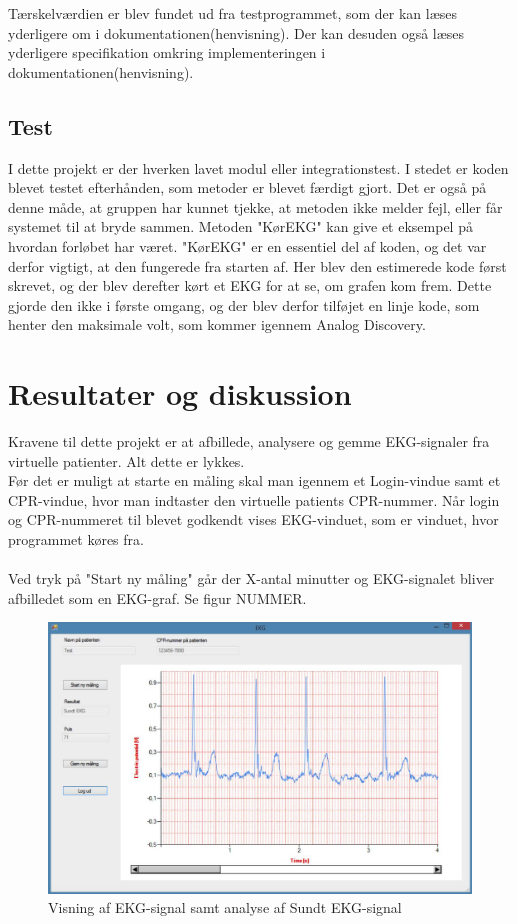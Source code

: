 Tærskelværdien er blev fundet ud fra testprogrammet, som der kan læses yderligere om i dokumentationen(henvisning). Der kan desuden også læses yderligere specifikation omkring implementeringen i dokumentationen(henvisning). 


\subsection{Test}
I dette projekt er der hverken lavet modul eller integrationstest. I stedet er koden blevet testet efterhånden, som metoder er blevet færdigt gjort. Det er også på denne måde, at gruppen har kunnet tjekke, at metoden ikke melder fejl, eller får systemet til at bryde sammen. Metoden "KørEKG" kan give et eksempel på hvordan forløbet har været. "KørEKG" er en essentiel del af koden, og det var derfor vigtigt, at den fungerede fra starten af. Her blev den estimerede kode først skrevet, og der blev derefter kørt et EKG for at se, om grafen kom frem. Dette gjorde den ikke i første omgang, og der blev derfor tilføjet en linje kode, som henter den maksimale volt, som kommer igennem Analog Discovery. 

\section{Resultater og diskussion}
Kravene til dette projekt er at afbillede, analysere og gemme EKG-signaler fra virtuelle patienter. Alt dette er lykkes. \\ 
Før det er muligt at starte en måling skal man igennem et Login-vindue samt et CPR-vindue, hvor man indtaster den virtuelle patients CPR-nummer. Når login og CPR-nummeret til blevet godkendt vises EKG-vinduet, som er vinduet, hvor programmet køres fra. \\ \\
Ved tryk på "Start ny måling" går der X-antal minutter og EKG-signalet bliver afbilledet som en EKG-graf. Se figur NUMMER. 

\begin{figure}[H]
	\centering
	\includegraphics[width=1\textwidth]{Figurer/Snip20150525_25}
	\caption{Visning af EKG-signal samt analyse af Sundt EKG-signal}
\end{figure}

